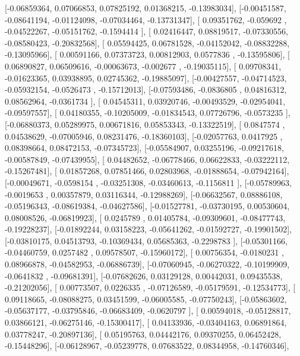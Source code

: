 \documentclass{article}
\begin{document}
       [-0.06859364,  0.07066853,  0.07825192,  0.01368215, -0.13983034],
       [-0.00451587, -0.08641194, -0.01124098, -0.07034464, -0.13731347],
       [ 0.09351762, -0.059692  , -0.04522267, -0.05151762, -0.1594414 ],
       [ 0.02416447,  0.08819517, -0.07330556, -0.08580423, -0.20832568],
       [ 0.05594425,  0.06781528, -0.04152042, -0.08832288, -0.13095966],
       [ 0.00591166,  0.07373723,  0.00812903,  0.0577836 , -0.13595806],
       [ 0.06890827,  0.06509616, -0.00063673, -0.002677  , -0.19035115],
       [ 0.09708341, -0.01623365,  0.03938895,  0.02745362, -0.19885097],
       [-0.00427557, -0.04714523, -0.05932154, -0.0526473 , -0.15712013],
       [-0.07593486, -0.0836805 ,  0.04816312,  0.08562964, -0.0361734 ],
       [ 0.04545311,  0.03920746, -0.00493529, -0.02954041, -0.09597557],
       [ 0.04180355, -0.10205009, -0.01834543,  0.07726796, -0.0573235 ],
       [-0.06880373,  0.05289975,  0.00671816,  0.05853343, -0.13322519],
       [ 0.0847574 ,  0.04538629, -0.07005946,  0.08231476, -0.18360103],
       [-0.02057763,  0.0417925 ,  0.08398664,  0.08472153, -0.07345723],
       [-0.05584907,  0.03255196, -0.09217618, -0.00587849, -0.07439955],
       [ 0.04482652, -0.06778466,  0.06622833, -0.03222112, -0.15267481],
       [ 0.01857268,  0.07851466,  0.02803968, -0.01888654, -0.07942164],
       [-0.00049671, -0.0598154 , -0.03251308, -0.03460613, -0.1156811 ],
       [-0.05789963, -0.0019653 ,  0.00357879,  0.03116344, -0.12988269],
       [-0.06632567,  0.08886108, -0.05196343, -0.08619384, -0.04627586],
       [-0.01527781, -0.03730195,  0.00530604,  0.08008526, -0.06819923],
       [ 0.0245789 ,  0.01405784, -0.09309601, -0.08477743, -0.19228237],
       [-0.01892244,  0.03158223, -0.05641262, -0.01592727, -0.19901502],
       [-0.03810175,  0.04513793, -0.10369434,  0.05685363, -0.2298783 ],
       [-0.05301166, -0.04460759,  0.0257482 ,  0.09578507, -0.15960172],
       [ 0.00756354, -0.0180231 ,  0.08966878, -0.04582953, -0.06886739],
       [-0.07060945, -0.06270322, -0.10199909, -0.0641832 , -0.09681391],
       [-0.07682626,  0.03129128,  0.00442031,  0.09435538, -0.21202056],
       [ 0.00773507,  0.0226335 , -0.07126589, -0.05179591, -0.12534773],
       [ 0.09118665, -0.08088275,  0.03451599, -0.06005585, -0.07750243],
       [-0.05863602, -0.05637177, -0.03795846, -0.06683409, -0.0620797 ],
       [ 0.00594018, -0.05128817,  0.03866121, -0.06275146, -0.15300417],
       [ 0.04133936, -0.03404163,  0.06891864,  0.03778247, -0.20897136],
       [ 0.05195763,  0.04442176,  0.09370255,  0.06452428, -0.15448296],
       [-0.06128967, -0.05239778,  0.07683522,  0.08344958, -0.14760346],
\end{document}
